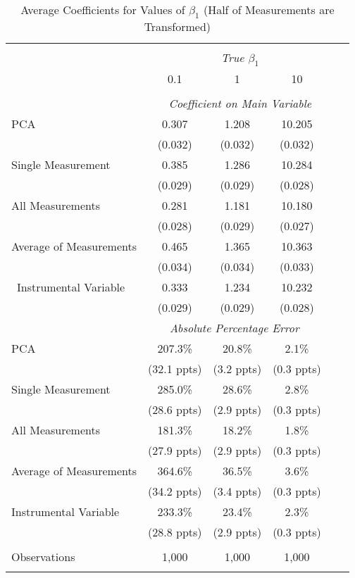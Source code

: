 \begin{table}[!htbp] \centering
  \caption{Average Coefficients for Values of $\beta_1$ (Half of Measurements are Transformed)\label{sim_beta1_5_exp}}
\begin{tabular}{@{\extracolsep{5pt}}lccccc}
\\[-1.8ex]\hline
\hline \\[-1.8ex]
& \multicolumn{4}{c}{\textit{True $\beta_1$}} \
\cr \
\\[-1.8ex] & 0.1 & 1 & 10\\
\hline \\[-1.8ex]
& \multicolumn{4}{c}{\textit{Coefficient on Main Variable}} \\
 PCA & 0.307 & 1.208 & 10.205  \\
  & (0.032) & (0.032) & (0.032)\\
  Single Measurement & 0.385 & 1.286 & 10.284  \\
& (0.029) & (0.029) & (0.028)\\
 All Measurements & 0.281 & 1.181 & 10.180  \\
  & (0.028) & (0.029) & (0.027)\\
 Average of Measurements & 0.465 & 1.365 & 10.363  \\
  & (0.034) & (0.034) & (0.033)\\\
  Instrumental Variable & 0.333 & 1.234 & 10.232 \\
& (0.029) & (0.029) & (0.028) \\
& \multicolumn{3}{c}{\textit{Absolute Percentage Error}} \\
  PCA & 207.3\% & 20.8\% & 2.1\%  \\
   & (32.1 ppts) & (3.2 ppts) & (0.3 ppts)\\
   Single Measurement & 285.0\% & 28.6\% & 2.8\%  \\
& (28.6 ppts) & (2.9 ppts) & (0.3 ppts) \\
All Measurements & 181.3\% & 18.2\% & 1.8\%  \\
  & (27.9 ppts) & (2.9 ppts) & (0.3 ppts)\\
  Average of Measurements & 364.6\% & 36.5\% & 3.6\%  \\
  & (34.2 ppts) & (3.4 ppts) & (0.3 ppts)\\
  Instrumental Variable & 233.3\% & 23.4\% & 2.3\%  \\
& (28.8 ppts) & (2.9 ppts) & (0.3 ppts)\\

\hline \\[-1.8ex]
 Observations & 1,000 & 1,000 & 1,000\\
\hline
\hline \\[-1.8ex]
\end{tabular}
\end{table}
